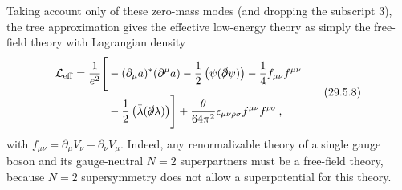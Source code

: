 Taking account only of these zero-mass modes (and dropping the subscript 3),
the tree approximation gives the effective low-energy theory as simply the
free-field theory with Lagrangian density
\begin{equation}
  \begin{aligned}
  \mathcal{L}_{\mathrm{eff}}
  =\frac{1}{e^2}\Biggl[
  &-(\partial_\mu a)^*(\partial^\mu a)
  -\frac12\left(\bar\psi(\sl{\partial}\psi)\right)
  -\frac14 f_{\mu\nu}f^{\mu\nu}
  \\
  &-\frac12\left(\bar\lambda(\sl{\partial}\lambda)\right)
  \Biggr]
  +\frac{\theta}{64\pi^2}
    \epsilon_{\mu\nu\rho\sigma}f^{\mu\nu}f^{\rho\sigma}\,,
  \end{aligned}
  \tag{29.5.8}\label{eq:29.5.8}
\end{equation}
with \(f_{\mu\nu}=\partial_\mu V_\nu-\partial_\nu V_\mu\). Indeed, any
renormalizable theory of a single gauge boson and its gauge-neutral \(N=2\)
superpartners must be a free-field theory, because \(N=2\) supersymmetry
does not allow a superpotential for this theory.

